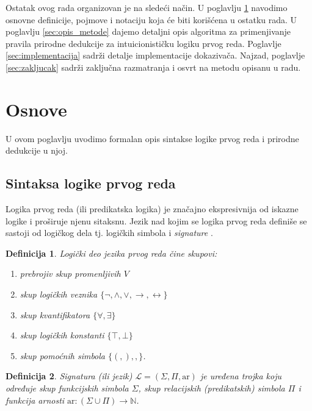 \documentclass[a4paper,10pt]{article}
\newtheorem{definition}{Definicija}[section]
\theoremstyle{remark}
\begin{document}
Ostatak ovog rada organizovan je na sledeći način.
U poglavlju \ref{sec:osnove} navodimo osnovne definicije, pojmove i notaciju
koja će biti korišćena u ostatku rada.
U poglavlju \ref{sec:opis_metode} dajemo detaljni opis algoritma za
primenjivanje pravila prirodne dedukcije za intuicionističku logiku prvog reda.
Poglavlje \ref{sec:implementacija} sadrži detalje implementacije dokazivača.
Najzad, poglavlje \ref{sec:zakljucak} sadrži zaključna razmatranja i osvrt na
metodu opisanu u radu.

\section{Osnove}
\label{sec:osnove}

U ovom poglavlju uvodimo formalan opis sintakse logike prvog reda i prirodne
dedukcije u njoj.

\subsection{Sintaksa logike prvog reda}

Logika prvog reda (ili predikatska logika) je značajno ekspresivnija od iskazne
logike i proširuje njenu sitaksnu.
Jezik nad kojim se logika prvog reda definiše se sastoji od logičkog dela tj.
logičkih simbola i \textit{signature} \cite{janicic2008mlur}.

\begin{definition}
    Logički deo jezika prvog reda čine skupovi:
    \begin{enumerate}
        \itemsep-0.3em
        \item prebrojiv skup promenljivih $V$
        \item skup logičkih veznika
        $\{\neg, \land, \lor, \rightarrow, \leftrightarrow\}$
        \item skup kvantifikatora $\{\forall, \exists\}$
        \item skup logičkih konstanti $\{\top, \bot\}$
        \item skup pomoćnih simbola $\{(, ), ,\}$.
    \end{enumerate}
\end{definition}

\begin{definition}
    Signatura (ili jezik) $\mathcal{L} = (\Sigma, \Pi, \mathrm{ar})$ je uređena
    trojka koju određuje skup funkcijskih simbola $\Sigma$, skup relacijskih
    (predikatskih) simbola $\Pi$ i funkcija arnosti
    $\mathrm{ar} : \left(\Sigma \cup \Pi\right) \to \mathbb{N}$.
\end{definition}
\end{document}
